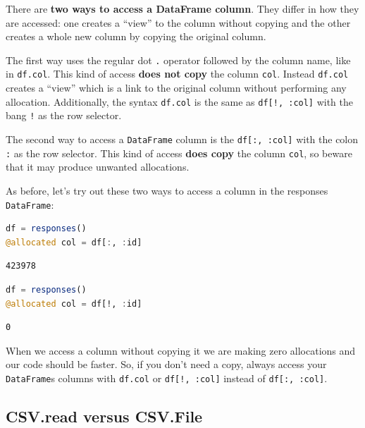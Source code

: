 \documentclass[
  notoc %
]{tufte-book}
\newcommand{\passthrough}[1]{#1}
\begin{document}
There are \textbf{two ways to access a DataFrame column}. They differ in
how they are accessed: one creates a ``view'' to the column without
copying and the other creates a whole new column by copying the original
column.

The first way uses the regular dot \passthrough{\lstinline!.!} operator
followed by the column name, like in \passthrough{\lstinline!df.col!}.
This kind of access \textbf{does not copy} the column
\passthrough{\lstinline!col!}. Instead \passthrough{\lstinline!df.col!}
creates a ``view'' which is a link to the original column without
performing any allocation. Additionally, the syntax
\passthrough{\lstinline!df.col!} is the same as
\passthrough{\lstinline"df[!, :col]"} with the bang
\passthrough{\lstinline"!"} as the row selector.

The second way to access a \passthrough{\lstinline!DataFrame!} column is
the \passthrough{\lstinline!df[:, :col]!} with the colon
\passthrough{\lstinline!:!} as the row selector. This kind of access
\textbf{does copy} the column \passthrough{\lstinline!col!}, so beware
that it may produce unwanted allocations.

As before, let's try out these two ways to access a column in the
responses \passthrough{\lstinline!DataFrame!}:

\begin{lstlisting}[language=Julia]
df = responses()
@allocated col = df[:, :id]
\end{lstlisting}

\begin{lstlisting}
423978
\end{lstlisting}

\begin{lstlisting}[language=Julia]
df = responses()
@allocated col = df[!, :id]
\end{lstlisting}

\begin{lstlisting}
0
\end{lstlisting}

When we access a column without copying it we are making zero
allocations and our code should be faster. So, if you don't need a copy,
always access your \passthrough{\lstinline!DataFrame!}s columns with
\passthrough{\lstinline!df.col!} or
\passthrough{\lstinline"df[!, :col]"} instead of
\passthrough{\lstinline!df[:, :col]!}.

\hypertarget{sec:df_performance_csv_read_file}{%
\subsection{CSV.read versus
CSV.File}\label{sec:df_performance_csv_read_file}}
\end{document}
